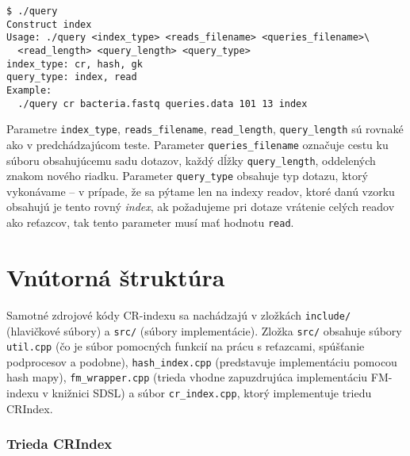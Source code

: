 \begin{verbatim}
$ ./query 
Construct index 
Usage: ./query <index_type> <reads_filename> <queries_filename>\
  <read_length> <query_length> <query_type>
index_type: cr, hash, gk
query_type: index, read
Example: 
  ./query cr bacteria.fastq queries.data 101 13 index
\end{verbatim}

Parametre \texttt{index\_type}, \texttt{reads\_filename}, \texttt{read\_length}, \texttt{query\_length} sú rovnaké ako v predchádzajúcom teste. Parameter \texttt{queries\_filename} označuje cestu ku súboru obsahujúcemu sadu dotazov, každý dĺžky \texttt{query\_length}, oddelených znakom nového riadku. Parameter \texttt{query\_type} obsahuje typ dotazu, ktorý vykonávame -- v prípade, že sa pýtame len na indexy readov, ktoré danú vzorku obsahujú je tento rovný \emph{index}, ak požadujeme pri dotaze vrátenie celých readov ako reťazcov, tak tento parameter musí mať hodnotu \texttt{read}.

\section{Vnútorná štruktúra}
Samotné zdrojové kódy CR-indexu sa nachádzajú v zložkách \texttt{include/} (hlavičkové súbory) a \texttt{src/} (súbory implementácie). Zložka \texttt{src/} obsahuje súbory \texttt{util.cpp} (čo je súbor pomocných funkcií na prácu s reťazcami, spúšťanie podprocesov a podobne), \texttt{hash\_index.cpp} (predstavuje implementáciu pomocou hash mapy), \texttt{fm\_wrapper.cpp} (trieda vhodne zapuzdrujúca implementáciu FM-indexu v knižnici SDSL) a súbor \texttt{cr\_index.cpp}, ktorý implementuje triedu CRIndex.

\subsubsection{Trieda CRIndex}
